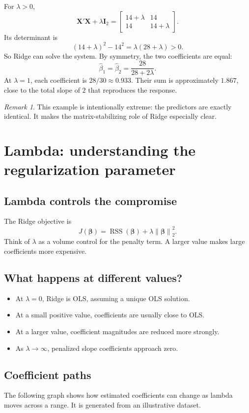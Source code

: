 \documentclass[11pt,a4paper]{article}
\numberwithin{equation}{section}
\theoremstyle{remark}
\newtheorem{remark}{Remark}[section]
\newcommand{\X}{\mathbf X}
\newcommand{\I}{\mathbf I}
\newcommand{\bta}{\boldsymbol{\beta}}
\newcommand{\RSS}{\operatorname{RSS}}
\newcommand{\norm}[1]{\left\lVert #1\right\rVert_2}
\begin{document}
For $\lambda>0$,
\[
\X'\X+\lambda\I_2=
\begin{bmatrix}14+\lambda&14\\14&14+\lambda\end{bmatrix}.
\]
Its determinant is
\[
(14+\lambda)^2-14^2=\lambda(28+\lambda)>0.
\]
So Ridge can solve the system. By symmetry, the two coefficients are equal:
\[
\widehat\beta_1=\widehat\beta_2=\frac{28}{28+2\lambda}.
\]
At $\lambda=1$, each coefficient is $28/30\approx0.933$. Their sum is
approximately $1.867$, close to the total slope of $2$ that reproduces
the response.

\begin{remark}
This example is intentionally extreme: the predictors are exactly identical.
It makes the matrix-stabilizing role of Ridge especially clear.
\end{remark}

\section{Lambda: understanding the regularization parameter}

\subsection{Lambda controls the compromise}
The Ridge objective is
\[
J(\bta)=\RSS(\bta)+\lambda\norm{\bta}^2.
\]
Think of $\lambda$ as a volume control for the penalty term. A larger value
makes large coefficients more expensive.

\subsection{What happens at different values?}
\begin{itemize}
\item At $\lambda=0$, Ridge is OLS, assuming a unique OLS solution.
\item At a small positive value, coefficients are usually close to OLS.
\item At a larger value, coefficient magnitudes are reduced more strongly.
\item As $\lambda\to\infty$, penalized slope coefficients approach zero.
\end{itemize}

\subsection{Coefficient paths}
The following graph shows how estimated coefficients can change as lambda
moves across a range. It is generated from an illustrative dataset.
\end{document}
